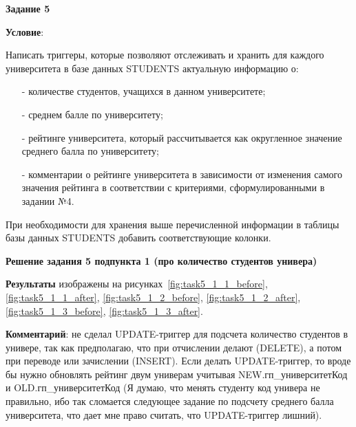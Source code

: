 \newpage

\begin{center}
  \textbf{Задание 5}
\end{center}

\textbf{Условие}:

Написать триггеры, которые позволяют отслеживать и хранить для каждого университета в базе данных STUDENTS актуальную информацию о:
\begin{itemize}
  \item[-] количестве студентов, учащихся в данном университете;
  \item[-] среднем балле по университету;
  \item[-] рейтинге университета, который рассчитывается как округленное значение среднего балла по университету;
  \item[-] комментарии о рейтинге университета в зависимости от изменения самого значения рейтинга в соответствии с критериями, сформулированными в задании №4.
\end{itemize}

При необходимости для хранения выше перечисленной информации в таблицы базы данных STUDENTS добавить соответствующие колонки.

\begin{center}
  \textbf{Решение задания 5 подпункта 1 (про количество студентов универа)}
\end{center}







\textbf{Результаты} изображены
на рисунках~\ref{fig:task5_1_1_before}, \ref{fig:task5_1_1_after},
\ref{fig:task5_1_2_before}, \ref{fig:task5_1_2_after},
\ref{fig:task5_1_3_before}, \ref{fig:task5_1_3_after}.

\textbf{Комментарий}: не сделал UPDATE-триггер для подсчета количество студентов в универе,
так как предполагаю, что при отчислении делают (DELETE), а потом при переводе или зачислении (INSERT).
Если делать UPDATE-триггер, то вроде бы нужно обновлять рейтинг двум универам учитывая NEW.гп\_университетКод и OLD.гп\_университетКод
(Я думаю, что менять студенту код универа не правильно, ибо так сломается следующее задание по подсчету среднего балла университета,
что дает мне право считать, что UPDATE-триггер лишний).

